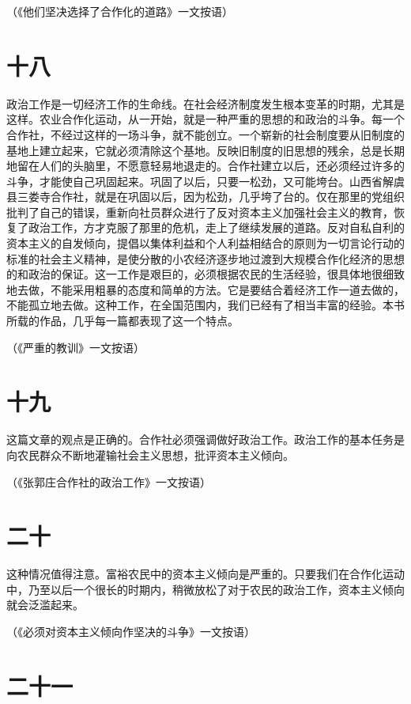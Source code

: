 （《他们坚决选择了合作化的道路》一文按语）

\section*{十八}

政治工作是一切经济工作的生命线。在社会经济制度发生根本变革的时期，尤其是这样。农业合作化运动，从一开始，就是一种严重的思想的和政治的斗争。每一个合作社，不经过这样的一场斗争，就不能创立。一个崭新的社会制度要从旧制度的基地上建立起来，它就必须清除这个基地。反映旧制度的旧思想的残余，总是长期地留在人们的头脑里，不愿意轻易地退走的。合作社建立以后，还必须经过许多的斗争，才能使自己巩固起来。巩固了以后，只要一松劲，又可能垮台。山西省解虞县三娄寺合作社，就是在巩固以后，因为松劲，几乎垮了台的。仅在那里的党组织批判了自己的错误，重新向社员群众进行了反对资本主义加强社会主义的教育，恢复了政治工作，方才克服了那里的危机，走上了继续发展的道路。反对自私自利的资本主义的自发倾向，提倡以集体利益和个人利益相结合的原则为一切言论行动的标准的社会主义精神，是使分散的小农经济逐步地过渡到大规模合作化经济的思想的和政治的保证。这一工作是艰巨的，必须根据农民的生活经验，很具体地很细致地去做，不能采用粗暴的态度和简单的方法。它是要结合着经济工作一道去做的，不能孤立地去做。这种工作，在全国范围内，我们已经有了相当丰富的经验。本书所载的作品，几乎每一篇都表现了这一个特点。


（《严重的教训》一文按语）

\section*{十九}

这篇文章的观点是正确的。合作社必须强调做好政治工作。政治工作的基本任务是向农民群众不断地灌输社会主义思想，批评资本主义倾向。


（《张郭庄合作社的政治工作》一文按语）

\section*{二十}

这种情况值得注意。富裕农民中的资本主义倾向是严重的。只要我们在合作化运动中，乃至以后一个很长的时期内，稍微放松了对于农民的政治工作，资本主义倾向就会泛滥起来。


（《必须对资本主义倾向作坚决的斗争》一文按语）

\section*{二十一}

